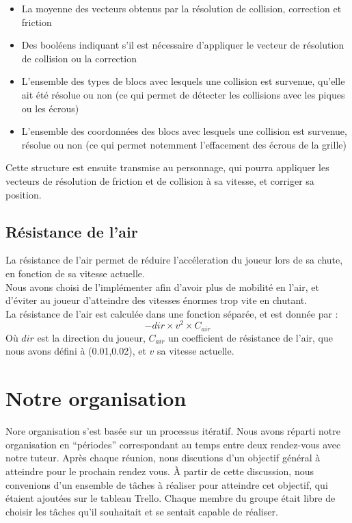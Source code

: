 \documentclass[10pt]{report}
\begin{document}
\begin{itemize}
  \item La moyenne des vecteurs obtenus par la résolution de collision, correction et friction
  \item Des booléens indiquant s'il est nécessaire d'appliquer le vecteur de résolution de collision ou la correction
  \item L'ensemble des types de blocs avec lesquels une collision est survenue, qu'elle ait été résolue ou non
  (ce qui permet de détecter les collisions avec les piques ou les écrous)
  \item L'ensemble des coordonnées des blocs avec lesquels une collision est survenue, résolue ou non
  (ce qui permet notemment l'effacement des écrous de la grille)
\end{itemize}

Cette structure est ensuite transmise au personnage, qui pourra appliquer les vecteurs de résolution de friction
et de collision à sa vitesse, et corriger sa position.

\subsection{Résistance de l'air}
La résistance de l'air permet de réduire l'accéleration du joueur lors de sa chute,
en fonction de sa vitesse actuelle.\\
Nous avons choisi de l'implémenter afin d'avoir plus de mobilité en l'air, et d'éviter au joueur d'atteindre
des vitesses énormes trop vite en chutant.\\
La résistance de l'air est calculée dans une fonction séparée, et est donnée par :
\[
 -dir \times v^2 \times C_{air}
\]
Où \(dir\) est la direction du joueur, \(C_{air}\) un coefficient de résistance de l'air, que nous avons défini à (0.01,0.02), et \(v\) sa vitesse actuelle.

\section{Notre organisation}

Nore organisation s'est basée sur un processus itératif.
Nous avons réparti notre organisation en ``périodes'' correspondant au temps entre deux rendez-vous avec notre tuteur.
Après chaque réunion, nous discutions d'un objectif général à atteindre pour le prochain rendez vous.
À partir de cette discussion, nous convenions d'un ensemble de tâches à réaliser pour atteindre cet objectif, qui étaient ajoutées sur le tableau Trello.
Chaque membre du groupe était libre de choisir les tâches qu'il souhaitait et se sentait capable de réaliser.
\end{document}
